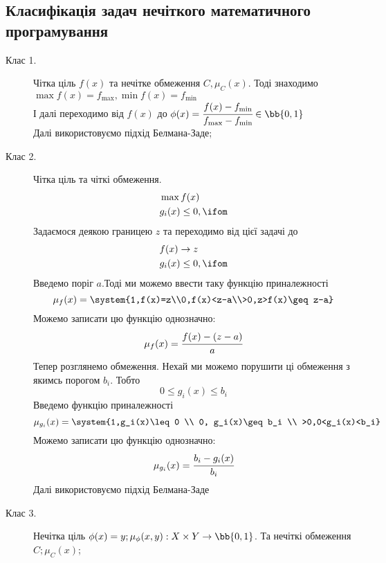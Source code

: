 \subsection{Класифікація задач нечіткого математичного програмування}
\begin{description}
\item[Клас 1.] Чітка ціль $f(x)$ та нечітке обмеження $C,\mu_C(x)$. Тоді знаходимо $\max f(x) = f_{\max},\min f(x) = f_{\min}$\\
І далі переходимо від $f(x)$ до $\phi(x) = \cfrac{f(x) - f_{\min}}{f_{\max} - f_{\min}}\in\bb{0,1}$\\
Далі використовуємо підхід Белмана-Заде;
\item[Клас 2.] Чітка ціль та чіткі обмеження.
\begin{eqnarray}
&\max f(x)\\
&g_i(x)\leq 0,\ifom
\end{eqnarray} 
Задаємося деякою границею $z$ та переходимо від цієї задачі до 
\begin{eqnarray}
&f(x)\to z\\
&g_i(x) \leq 0,\ifom
\end{eqnarray}
Введемо поріг $a$.Тоді ми можемо ввести таку функцію приналежності
\begin{equation}
\mu_f(x) = \system{1,f(x)=z\\0,f(x)<z-a\\>0,z>f(x)\geq z-a}
\end{equation}
Можемо записати цю функцію однозначно:
\begin{equation}
\mu_f(x) = \cfrac{f(x)-(z-a)}{a}
\end{equation}
Тепер розглянемо обмеження. Нехай ми можемо порушити ці обмеження з якимсь порогом $b_i$. Тобто
\begin{equation}
0\leq g_i(x) \leq b_i
\end{equation}
Введемо функцію приналежності
\begin{equation}
\mu_{g_i}(x) = \system{1,g_i(x)\leq 0 \\ 0, g_i(x)\geq b_i \\ >0,0<g_i(x)<b_i}
\end{equation}
Можемо записати цю функцію однозначно:
\begin{equation}
\mu_{g_i}(x) = \cfrac{b_i - g_i(x)}{b_i}
\end{equation}
Далі використовуємо підхід Белмана-Заде
\item[Клас 3.] Нечітка ціль $\phi(x)=y;\mu_\phi(x,y):X\times Y\to\bb{0,1}$. Та нечіткі обмеження $C;\mu_C(x)$;

\end{description}
